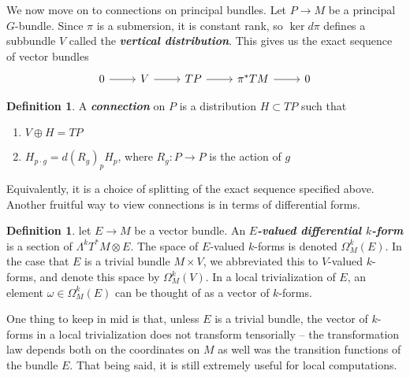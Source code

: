 \documentclass[psamsfonts, 12pt]{amsart}
\theoremstyle{definition}
\newtheorem{defn}[thm]{Definition}
\theoremstyle{remark}
\newcommand{\ib}[1]{\textbf{\textit{#1}}}
\begin{document}
We now move on to connections on principal bundles. Let $P \to M$ be a principal $G$-bundle.
Since $\pi$ is a submersion, it is constant rank, so $\ker d\pi$ defines a
subbundle $V$ called the \ib{vertical distribution}. This gives us the exact sequence
of vector bundles
\[\begin{tikzcd}
0 \ar[r] & V \ar[r] & TP \ar[r] & \pi^*TM \ar[r] & 0
\end{tikzcd}\]
%
\begin{defn}
A \ib{connection} on $P$ is a distribution $H \subset TP$ such that
\begin{enumerate}
  \item $V \oplus H = TP$
  \item $H_{p \cdot g} = d(R_g)_pH_p$, where $R_g : P \to P$ is the action of $g$
\end{enumerate}
\end{defn}
%
Equivalently, it is a choice of splitting of the exact sequence specified above. Another
fruitful way to view connections is in terms of differential forms.
%
\begin{defn}
let $E \to M$ be a vector bundle. An \ib{$E$-valued differential $k$-form} is
a section of $\Lambda^kT^*M \otimes E$. The space of $E$-valued $k$-forms is denoted
$\Omega^k_M(E)$. In the case that $E$ is a trivial bundle $M \times V$, we
abbreviated this to $V$-valued $k$-forms, and denote this space by $\Omega^k_M(V)$.
In a local trivialization of $E$, an element $\omega \in \Omega^k_M(E)$ can
be thought of as a vector of $k$-forms.
\end{defn}
%
One thing to keep in mid is that, unless $E$ is a trivial bundle, the
vector of $k$-forms in a local trivialization does not transform tensorially --
the transformation law depends both on the coordinates on $M$ as well was the
transition functions of the bundle $E$. That being said, it is still extremely
useful for local computations. \\
\end{document}
